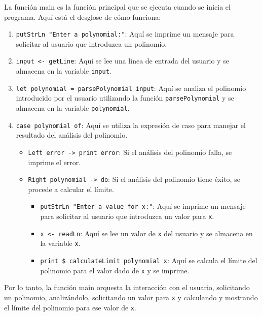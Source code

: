 \documentclass{article}
\begin{document}

La función main es la función principal que se ejecuta cuando se inicia el programa. Aquí está el desglose de cómo funciona:

\begin{enumerate}
  \item \texttt{putStrLn "Enter a polynomial:"}: Aquí se imprime un mensaje para solicitar al usuario que introduzca un polinomio.
  \item \texttt{input <- getLine}: Aquí se lee una línea de entrada del usuario y se almacena en la variable \texttt{input}.
  \item \texttt{let polynomial = parsePolynomial input}: Aquí se analiza el polinomio introducido por el usuario utilizando la función \texttt{parsePolynomial} y se almacena en la variable \texttt{polynomial}.
  \item \texttt{case polynomial of}: Aquí se utiliza la expresión de caso para manejar el resultado del análisis del polinomio.
    \begin{itemize}
      \item \texttt{Left error -> print error}: Si el análisis del polinomio falla, se imprime el error.
      \item \texttt{Right polynomial -> do}: Si el análisis del polinomio tiene éxito, se procede a calcular el límite.
        \begin{itemize}
          \item \texttt{putStrLn "Enter a value for x:"}: Aquí se imprime un mensaje para solicitar al usuario que introduzca un valor para \texttt{x}.
          \item \texttt{x <- readLn}: Aquí se lee un valor de \texttt{x} del usuario y se almacena en la variable \texttt{x}.
          \item \texttt{print \$ calculateLimit polynomial x}: Aquí se calcula el límite del polinomio para el valor dado de \texttt{x} y se imprime.
        \end{itemize}
    \end{itemize}
\end{enumerate}

Por lo tanto, la función main orquesta la interacción con el usuario, solicitando un polinomio, analizándolo, solicitando un valor para \texttt{x} y calculando y mostrando el límite del polinomio para ese valor de \texttt{x}.
\end{document}
